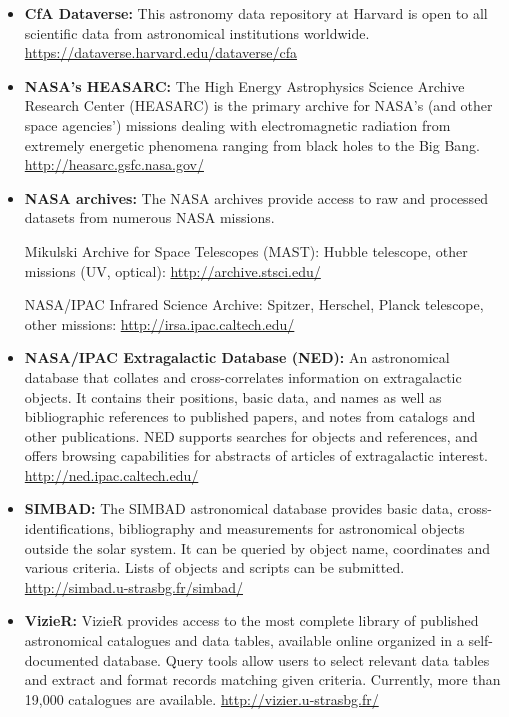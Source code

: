 \begin{itemize}
\item
  \textbf{CfA Dataverse:} This astronomy data repository at Harvard is
  open to all scientific data from astronomical institutions worldwide.
  \url{https://dataverse.harvard.edu/dataverse/cfa}
\item
  \textbf{NASA's HEASARC:} The High Energy Astrophysics Science Archive
  Research Center (HEASARC) is the primary archive for NASA's (and other
  space agencies') missions dealing with electromagnetic radiation from
  extremely energetic phenomena ranging from black holes to the Big
  Bang. \url{http://heasarc.gsfc.nasa.gov/}
\item
  \textbf{NASA archives:} The NASA archives provide access to raw and
  processed datasets from numerous NASA missions.

  Mikulski Archive for Space Telescopes (MAST): Hubble telescope, other
  missions (UV, optical): \url{http://archive.stsci.edu/}

  NASA/IPAC Infrared Science Archive: Spitzer, Herschel, Planck
  telescope, other missions: \url{http://irsa.ipac.caltech.edu/}
\item
  \textbf{NASA/IPAC Extragalactic Database (NED):} An astronomical
  database that collates and cross-correlates information on
  extragalactic objects. It contains their positions, basic data, and
  names as well as bibliographic references to published papers, and
  notes from catalogs and other publications. NED supports searches for
  objects and references, and offers browsing capabilities for abstracts
  of articles of extragalactic interest.
  \url{http://ned.ipac.caltech.edu/}
\item
  \textbf{SIMBAD:} The SIMBAD astronomical database provides basic data,
  cross-identifications, bibliography and measurements for astronomical
  objects outside the solar system. It can be queried by object name,
  coordinates and various criteria. Lists of objects and scripts can be
  submitted. \url{http://simbad.u-strasbg.fr/simbad/}
\item
  \textbf{VizieR:} VizieR provides access to the most complete library
  of published astronomical catalogues and data tables, available online
  organized in a self-documented database. Query tools allow users to
  select relevant data tables and extract and format records matching
  given criteria. Currently, more than 19,000 catalogues are available.
  \url{http://vizier.u-strasbg.fr/}
\end{itemize}

